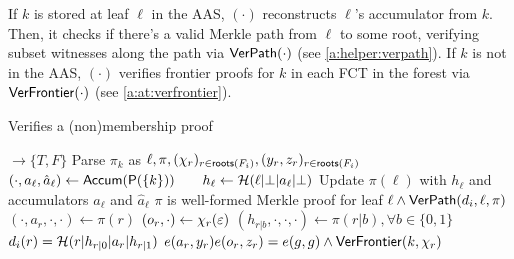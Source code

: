 If $k$ is stored at leaf $\ell$ in the AAS, {\vermemb}$(\cdot)$ reconstructs $\ell$'s accumulator from $k$.
Then, it checks if there's a valid Merkle path from $\ell$ to some root, verifying subset witnesses along the path via $\mathsf{VerPath}(\cdot)$ (see \cref{a:helper:verpath}).
If $k$ is not in the AAS, {\vermemb}$(\cdot)$ verifies frontier proofs for $k$ in each FCT in the forest via $\mathsf{VerFrontier}(\cdot)$ (see \cref{a:at:verfrontier}).

\begin{algorithm}[H]%
    \caption{\small Verifies a (non)membership proof}
    \label{a:aas:vermemb}
    \label{a:helper:verpath}
    \begin{algorithmic}[1]
     $\rightarrow \{T,F\}$
    \State Parse $\pi_{k}$ as $\ell, \pi, (\chi_r)_{r\in \mathsf{roots}(F_i)}, (y_r, z_r)_{r\in \mathsf{roots}(F_i)}$
     
    \label{a:aas:vermemb:foreach-leaf}
        \label{a:aas:vermemb:verpath-begin}
        \State $(\cdot, a_\ell, \hat{a}_\ell)\gets \mathsf{Accum}(\mathsf{P}(\{k\}))\qquad h_\ell \gets \mathcal{H}(\ell|\bot|a_\ell|\bot)$
        \State Update $\pi(\ell)$ with $h_\ell$ and accumulators $a_\ell$ and $\hat{a}_\ell$
        \Assert $\pi$ is well-formed Merkle proof for leaf $\ell \wedge {\verpath(d_i, \ell, \pi)}$
        \label{a:aas:vermemb:verpath-end}
    \Else  {}
        \label{a:aas:vermemb:verfrontier-begin}
         
            \State $(\cdot,a_{r},\cdot,\cdot)\gets \pi(r)$ \quad $(o_r, \cdot) \gets \chi_r(\varepsilon)$
            \State $({h}_{r|b},\cdot,\cdot,\cdot) \gets \pi(r|b),\forall b\in \{0,1\}$
            \Assert $d_i(r) = \mathcal{H}(r|h_{r|0}|a_r|h_{r|1})$
            \Assert $e(a_r,y_r)e(o_r,z_r) = e(g,g) \wedge \mathsf{VerFrontier}(k, \chi_r)$
        \EndFor
        \label{a:aas:vermemb:verfrontier-end}
    \EndIf
    \EndFunction


\end{algorithmic}
\end{algorithm}
